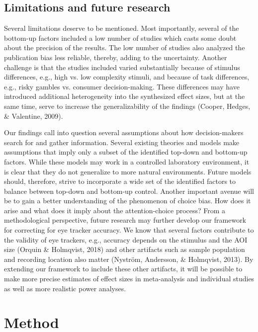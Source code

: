 \documentclass{article}
\begin{document}
\subsection{Limitations and future research}

Several limitations deserve to be mentioned. Most importantly, several of the bottom-up factors included a low number of studies which casts some doubt about the precision of the results. The low number of studies also analyzed the publication bias less reliable, thereby, adding to the uncertainty. Another challenge is that the studies included varied substantially because of stimulus differences, e.g., high vs. low complexity stimuli, and because of task differences, e.g., risky gambles vs. consumer decision-making. These differences may have introduced additional heterogeneity into the synthesized effect sizes, but at the same time, serve to increase the generalizability of the findings (Cooper, Hedges, \& Valentine, 2009). 

Our findings call into question several assumptions about how decision-makers search for and gather information. Several existing theories and models make assumptions that imply only a subset of the identified top-down and bottom-up factors. While these models may work in a controlled laboratory environment, it is clear that they do not generalize to more natural environments. Future models should, therefore, strive to incorporate a wide set of the identified factors to balance between top-down and bottom-up control. Another important avenue will be to gain a better understanding of the phenomenon of choice bias. How does it arise and what does it imply about the attention-choice process? From a methodological perspective, future research may further develop our framework for correcting for eye tracker accuracy. We know that several factors contribute to the validity of eye trackers, e.g., accuracy depends on the stimulus and the AOI size (Orquin \& Holmqvist, 2018) and other artifacts such as sample population and recording location also matter (Nyström, Andersson, \& Holmqvist, 2013). By extending our framework to include these other artifacts, it will be possible to make more precise estimates of effect sizes in meta-analysis and individual studies as well as more realistic power analyses.    



\section{Method}
\end{document}

